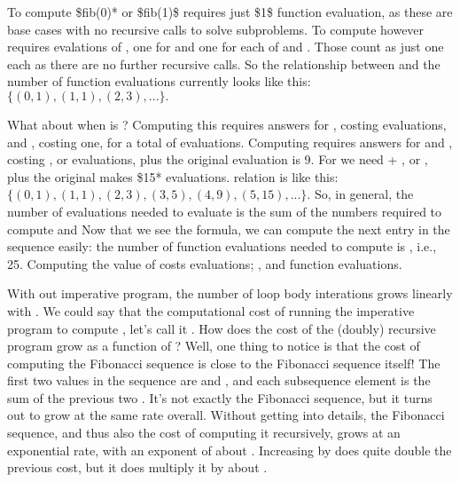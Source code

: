 \documentclass[letterpaper,10pt,english]{sphinxmanual}
\begin{document}
To compute \$fib(0)* or \$fib(1)\$ requires just \$1\$ function evaluation,
as these are base cases with no recursive calls to solve subproblems.
To compute  however requires  evalations of , one for
 and one for each of  and . Those count as just one each as
there are no further recursive calls. So the relationship between 
and the number of function evaluations currently looks like this:
\(\{ (0,1), (1,1), (2,3), ... \}.\)

What about when  is ?  Computing this requires answers for
, costing  evaluations, and , costing one, for a
total of  evaluations. Computing  requires answers for
 and , costing , or  evaluations, plus the
original evaluation is 9. For  we need  + , or ,
plus the original makes \$15* evaluations.  relation is like this:
\(\{ (0,1), (1,1), (2,3), (3,5), (4,9), (5, 15), ... \}.\) So, in
general, the number of evaluations needed to evaluate  is
the sum of the numbers required to compute  and  Now that we see the formula, we can compute the next entry in the
sequence easily: the number of function evaluations needed to compute
 is , i.e., 25. Computing the value of 
costs  evaluations; , 
and  function evaluations.

With out imperative program, the number of loop body interations grows
linearly with . We could say that the computational cost of running
the imperative program to compute , let’s call it . How does the cost of the (doubly) recursive program grow
as a function of ? Well, one thing to notice is that the cost of
computing the Fibonacci sequence is close to the Fibonacci sequence
itself! The first two values in the  sequence are  and ,
and each subsequence element is the sum of the previous two .
It’s not exactly the Fibonacci sequence, but it turns out to grow at
the same rate overall. Without getting into details, the Fibonacci
sequence, and thus also the cost of computing it recursively, grows at
an exponential rate, with an exponent of about . Increasing 
by  does quite double the previous cost, but it does multiply it by
about .
\end{document}
